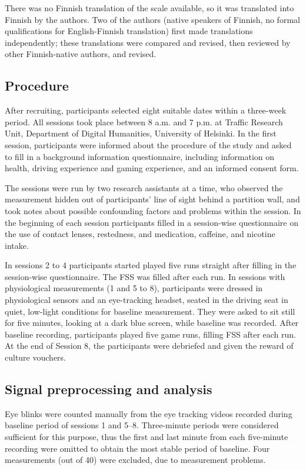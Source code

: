 \documentclass[fleqn,10pt]{wlscirep}
\begin{document}
There was no Finnish translation of the scale available, so it was translated into Finnish by the authors. Two of the authors (native speakers of Finnish, no formal qualifications for English-Finnish translation) first made translations independently; these translations were compared and revised, then reviewed by other Finnish-native authors, and revised.

\subsection*{Procedure}
After recruiting, participants selected eight suitable dates within a three-week period. All sessions took place between 8 a.m. and 7 p.m. at Traffic Research Unit, Department of Digital Humanities, University of Helsinki. In the first session, participants were informed about the procedure of the study and asked to fill in a background information questionnaire, including information on health, driving experience and gaming experience, and an informed consent form.

The sessions were run by two research assistants at a time, who observed the measurement hidden out of participants' line of sight behind a partition wall, and took notes about possible confounding factors and problems within the session. In the beginning of each session participants filled in a session-wise questionnaire on the use of contact lenses, restedness, and medication, caffeine, and nicotine intake.

In  sessions 2 to 4 participants started played five runs straight after filling in the session-wise questionnaire. The FSS was filled after each run. In sessions with physiological measurements (1 and 5 to 8), participants were dressed in physiological sensors and an eye-tracking headset, seated in the driving seat in quiet, low-light conditions for baseline measurement. They were asked to sit still for five minutes, looking at a dark blue screen, while baseline was recorded. After baseline recording, participants played five game runs, filling FSS after each run. At the end of Session 8, the participants were debriefed and given the reward of culture vouchers.

\subsection*{Signal preprocessing and analysis}
Eye blinks were counted manually from the eye tracking videos recorded during baseline period of sessions 1 and 5--8. Three-minute periods were considered sufficient for this purpose, thus the first and last minute from each five-minute recording were omitted to obtain the most stable period of baseline. Four measurements (out of 40) were excluded, due to measurement problems.
\end{document}
